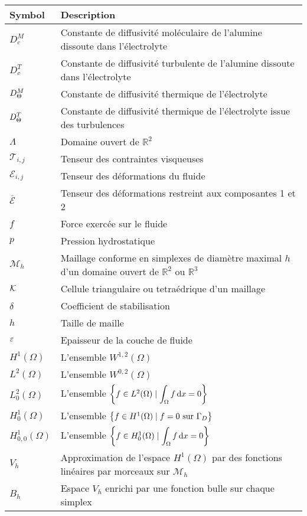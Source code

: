 \begin{tabularx}{\textwidth}{@{}lX@{}}
  \toprule
  Symbol & Description \\
  \midrule
  $D_c^M$ & Constante de diffusivité moléculaire de l'alumine dissoute dans l'électrolyte\\
  $D_c^T$ & Constante de diffusivité turbulente de l'alumine dissoute dans l'électrolyte\\
  $D_\Theta^M$ & Constante de diffusivité thermique de l'électrolyte\\
  $D_\Theta^T$ & Constante de diffusivité thermique de l'électrolyte issue des turbulences\\
  $\Lambda$ & Domaine ouvert de $\mathbb R^2$\\
  $\mathcal T_{i,j}$ & Tenseur des contraintes visqueuses \\
  $\mathcal E_{i,j}$ & Tenseur des déformations du fluide \\
  $\bar{\mathcal E}$ & Tenseur des déformations restreint aux composantes 1 et 2 \\
  $f$ & Force exercée sur le fluide \\
  $p$ & Pression hydrostatique \\
  $\mathcal M_h$ & Maillage conforme en simplexes de diamètre maximal $h$ d'un domaine ouvert de $\mathbb R^2$ ou $\mathbb R^3$\\
  ${\mathcal K}$ & Cellule triangulaire ou tetraédrique d'un maillage\\
  $\delta$ & Coefficient de stabilisation \\
  $h$ & Taille de maille \\
  $\varepsilon$ & Epaisseur de la couche de fluide \\
  $H^1(\Omega)$ & L'ensemble $W^{1, 2}(\Omega)$\\
  $L^2(\Omega)$ & L'ensemble $W^{0, 2}(\Omega)$\\
  $L^2_0(\Omega)$ & L'ensemble $\left\{ f \in L^2(\Omega) \mid \displaystyle\int_\Omega f\,\mathrm dx = 0 \right\}$\\
  $H^1_0(\Omega)$ & L'ensemble $\left\{ f \in H^1(\Omega) \mid f = 0 \text{ sur } \Gamma_D \right\}$\\
  $H^1_{0,0}(\Omega)$ & L'ensemble $\left\{ f \in H^1_0(\Omega) \mid \displaystyle\int_\Omega f\,\mathrm dx = 0 \right\}$\\
  $V_h$ & Approximation de l'espace $H^1(\Omega)$ par des fonctions
  linéaires par morceaux sur $\mathcal M_h$\\
  $B_h$ & Espace $V_h$ enrichi par une fonction bulle sur chaque simplex\\
  \bottomrule
\end{tabularx}
